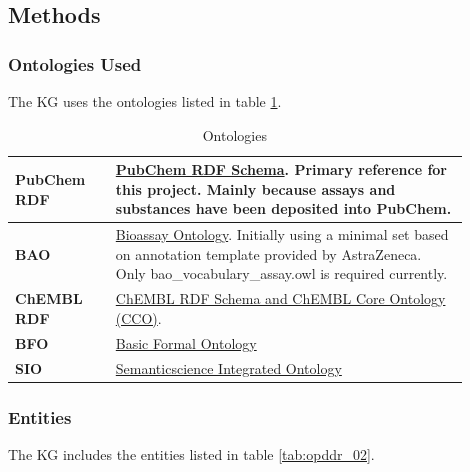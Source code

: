 \subsection{Methods}

\subsubsection{Ontologies Used}

The KG uses the ontologies listed in table \ref{tab:opddr_01}.

\begin{table}
\caption{Ontologies}
\label{tab:opddr_01}
\centering
\begin{tabular}{p{0.2\linewidth}p{0.7\linewidth}}
\hline
\textbf{PubChem RDF} & \href{http://rdf.ncbi.nlm.nih.gov/pubchem/}{PubChem RDF Schema}. Primary reference for this project.  Mainly because assays and substances have been deposited into PubChem.\\
\hline
\textbf{BAO} & \href{http://www.bioassayontology.org/bao\#}{Bioassay Ontology}.  Initially using a minimal set based on annotation template provided by AstraZeneca.  Only bao\_vocabulary\_assay.owl is required currently.\\
\hline
\textbf{ChEMBL RDF} & \href{http://rdf.ebi.ac.uk/terms/chembl\#}{ChEMBL RDF Schema and ChEMBL Core Ontology (CCO)}. 
\\
\hline
\textbf{BFO} &  \href{http://purl.obolibrary.org/obo/}{Basic Formal Ontology}\\
\hline
\textbf{SIO} & \href{http://semanticscience.org/resource/}{Semanticscience Integrated Ontology}\\
\hline
\end{tabular}
\end{table}

\subsubsection{Entities}

The KG includes the entities listed in table \ref{tab:opddr_02}.

